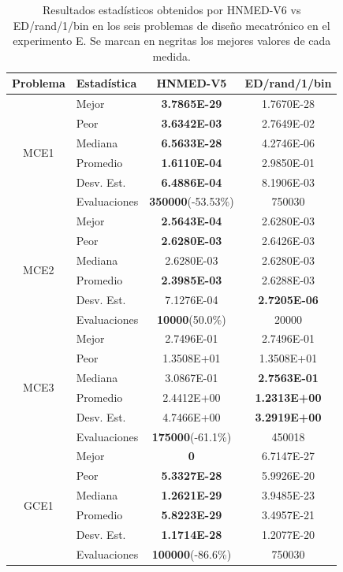 \begin{table}
	\centering
	\caption[Resultados estadísticos obtenidos por HNMED-V6 vs ED/rand/1/bin
	en los seis problemas de diseño mecatrónico.]{Resultados estadísticos obtenidos por HNMED-V6 vs ED/rand/1/bin
		en los seis problemas de diseño mecatrónico en el experimento E. Se marcan en negritas los
		mejores valores de cada medida.} \label{tab:Resultados estadísticos obtenidos por variantes HNMED6 y ED  en experimento E.}
	\begin{tabular}{clcc} 
		\hline
		Problema              & Estadística  & HNMED-V5 & ED/rand/1/bin  \\ 
		\hline
		\multirow{6}{*}{MCE1} & Mejor        & \textbf{3.7865E-29} &1.7670E-28          \\
		& Peor         &\textbf{3.6342E-03}&2.7649E-02
		\\
		& Mediana      &\textbf{6.5633E-28}&4.2746E-06            \\
		& Promedio     &\textbf{1.6110E-04}&2.9850E-01            \\
		& Desv. Est.   &\textbf{6.4886E-04}& 8.1906E-03
		\\
		& Evaluaciones &\textbf{350000}(-53.53\%)  &  750030       \\
		\hline
		
		\multirow{6}{*}{MCE2} & Mejor        &\textbf{2.5643E-04}&2.6280E-03
		\\
		& Peor         &\textbf{2.6280E-03}&2.6426E-03  \\
		& Mediana      &2.6280E-03&2.6280E-03   \\
		& Promedio     &\textbf{2.3985E-03}&2.6288E-03   \\
		& Desv. Est.   &7.1276E-04&\textbf{2.7205E-06} \\
		& Evaluaciones &\textbf{10000}(50.0\%) &20000                \\
		\hline
		
		\multirow{6}{*}{MCE3} & Mejor        &2.7496E-01&2.7496E-01  \\
		& Peor         &1.3508E+01&1.3508E+01     \\
		& Mediana      &3.0867E-01&\textbf{2.7563E-01} \\
		& Promedio     &2.4412E+00&\textbf{1.2313E+00}\\
		& Desv. Est.   &4.7466E+00&\textbf{3.2919E+00}\\
		& Evaluaciones &\textbf{175000}(-61.1\%)& 450018 \\
		\hline
		\multirow{6}{*}{GCE1} & Mejor        &\textbf{0}&6.7147E-27\\
		& Peor         &\textbf{5.3327E-28}&5.9926E-20\\
		& Mediana      &\textbf{1.2621E-29}&3.9485E-23\\
		& Promedio     &\textbf{5.8223E-29}&3.4957E-21\\
		& Desv. Est.   &\textbf{1.1714E-28}&1.2077E-20\\
		& Evaluaciones &\textbf{100000}(-86.6\%)&750030 \\
		\hline
		

\end{tabular}
\end{table}

